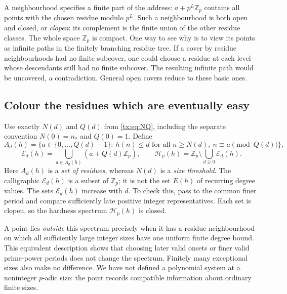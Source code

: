 A neighbourhood specifies a finite part of the address:
$a+p^L\mathbb Z_p$ contains all points with the chosen residue modulo
$p^L$. Such a neighbourhood is both open and closed, or \emph{clopen}:
its complement is the finite union of the other residue classes.
The whole space $\mathbb Z_p$ is compact. One way to see why is to
view its points as infinite paths in the finitely branching residue
tree. If a cover by residue neighbourhoods had no finite subcover,
one could choose a residue at each level whose descendants still had
no finite subcover. The resulting infinite path would be uncovered,
a contradiction. General open covers reduce to these basic ones.

\subsection{Colour the residues which are eventually easy}
Use exactly $N(d)$ and $Q(d)$ from \eqref{tx:eq:NQ}, including the
separate convention $N(0)=n_*$ and $Q(0)=1$. Define
\[
 A_d(h)=\{a\in\{0,\ldots,Q(d)-1\}:\ h(n)\le d
       \text{ for all }n\ge N(d),\ n\equiv a\pmod{Q(d)}\},
\]
\[
 \mathcal E_d(h)=\bigcup_{a\in A_d(h)}(a+Q(d)\mathbb Z_p),\qquad
 \mathcal H_p(h)=\mathbb Z_p\setminus\bigcup_{d\ge0}\mathcal E_d(h).
\]
Here $A_d(h)$ is a \emph{set of residues}, whereas $N(d)$ is a
\emph{size threshold}. The calligraphic $\mathcal E_d(h)$ is a subset
of $\mathbb Z_p$; it is not the set $E(h)$ of recurring degree values.
The sets $\mathcal E_d(h)$ increase with $d$. To check this, pass to
the common finer period and compare sufficiently late positive integer
representatives. Each set is clopen, so the hardness spectrum
$\mathcal H_p(h)$ is closed.

A point lies \emph{outside} this spectrum precisely when it has a
residue neighbourhood on which all sufficiently large integer sizes
have one uniform finite degree bound. This equivalent description
shows that choosing later valid onsets or finer valid prime-power
periods does not change the spectrum. Finitely many exceptional sizes
also make no difference. We have not defined a polynomial system at
a noninteger $p$-adic size: the point records compatible information
about ordinary finite sizes.

